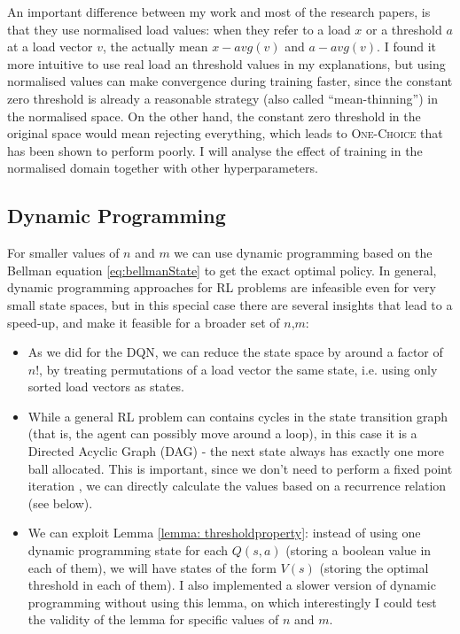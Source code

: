 An important difference between my work and most of the research papers, is that they use normalised load values: when they refer to a load $x$ or a threshold $a$ at a load vector $v$, the actually mean $x-avg(v)$ and $a-avg(v)$. I found it more intuitive to use real load an threshold values in my explanations, but using normalised values can make convergence during training faster, since the constant zero threshold is already a reasonable strategy (also called ``mean-thinning'') in the normalised space. On the other hand, the constant zero threshold in the original space would mean rejecting everything, which leads to \textsc{One-Choice} that has been shown to perform poorly. I will analyse the effect of training in the normalised domain together with other hyperparameters.



\subsection{Dynamic Programming}


For smaller values of $n$ and $m$ we can use dynamic programming based on the Bellman equation \ref{eq:bellmanState} to get the exact optimal policy. In general, dynamic programming approaches for RL problems are infeasible even for very small state spaces, but in this special case there are several insights that lead to a speed-up, and make it feasible for a broader set of $n$,$m$:


\begin{itemize}
    \item 
    As we did for the DQN, we can reduce the state space by around a factor of $n!$, by treating permutations of a load vector the same state, i.e. using only sorted load vectors as states.
    \item
    While a general RL problem can contains cycles in the state transition graph (that is, the agent can possibly move around a loop), in this case it is a Directed Acyclic Graph (DAG) - the next state always has exactly one more ball allocated. This is important, since we don't need to perform a fixed point iteration \cite{rhoades1991fixedpointiteration}, we can directly calculate the values based on a recurrence relation (see below).
    \item
    We can exploit Lemma \ref{lemma: thresholdproperty}: instead of using one dynamic programming state for each $Q(s,a)$ (storing a boolean value in each of them), we will have states of the form $V(s)$ (storing the optimal threshold in each of them). I also implemented a slower version of dynamic programming without using this lemma, on which interestingly I could test the validity of the lemma for specific values of $n$ and $m$.
\end{itemize}


